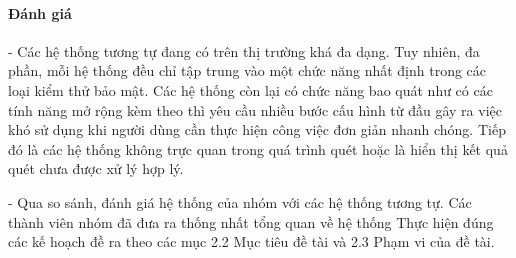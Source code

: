 \paragraph{Đánh giá}
\tab - Các hệ thống tương tự đang có trên thị trường khá đa dạng.
Tuy nhiên, đa phần, mỗi hệ thống đều chỉ tập trung vào một chức năng nhất định trong các loại kiểm thử bảo mật.
Các hệ thống còn lại có chức năng bao quát như \applicationname có các tính năng mở rộng kèm theo thì yêu cầu nhiều bước cấu hình từ đầu gây ra việc khó sử dụng khi người dùng cần thực hiện công việc đơn giản nhanh chóng.
Tiếp đó là các hệ thống không trực quan trong quá trình quét hoặc là hiển thị kết quả quét chưa được xử lý hợp lý.
\par

- Qua so sánh, đánh giá hệ thống của nhóm với các hệ thống tương tự. 
Các thành viên nhóm đã đưa ra thống nhất tổng quan về hệ thống \applicationname Thực hiện đúng các kế
hoạch đề ra theo các mục 2.2 Mục tiêu đề tài và 2.3 Phạm vi của đề tài.

